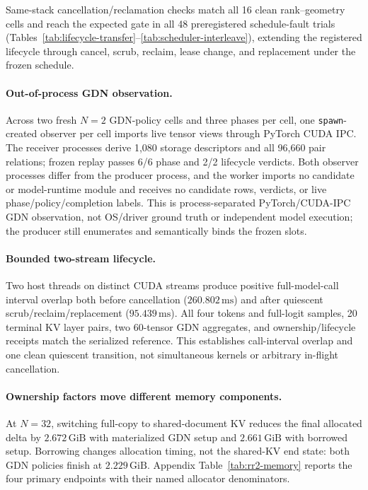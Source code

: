 \documentclass{article}
\newcommand{\gib}{\,\mathrm{GiB}}
\begin{document}


Same-stack cancellation/reclamation checks match all 16 clean rank--geometry
cells and reach the expected gate in all 48 preregistered schedule-fault trials
(Tables~\ref{tab:lifecycle-transfer}--\ref{tab:scheduler-interleave}), extending
the registered lifecycle through cancel, scrub, reclaim, lease change, and
replacement under the frozen schedule.

\paragraph{Out-of-process GDN observation.}
Across two fresh $N=2$ GDN-policy cells and three phases per cell, one
\texttt{spawn}-created observer per cell imports live tensor views through
PyTorch CUDA IPC.  The receiver processes derive 1,080 storage descriptors and
all 96,660 pair relations; frozen replay passes 6/6 phase and 2/2 lifecycle
verdicts.  Both observer processes differ from the producer process, and the
worker imports no candidate or model-runtime module and receives no candidate
rows, verdicts, or live phase/policy/completion labels.  This is
process-separated PyTorch/CUDA-IPC GDN observation, not OS/driver ground truth
or independent model execution; the producer still enumerates and semantically
binds the frozen slots.

\paragraph{Bounded two-stream lifecycle.}
Two host threads on distinct CUDA streams produce positive full-model-call
interval overlap both before cancellation ($260.802\,\mathrm{ms}$) and after
quiescent scrub/reclaim/replacement ($95.439\,\mathrm{ms}$).  All four tokens
and full-logit samples, 20 terminal KV layer pairs, two 60-tensor GDN
aggregates, and ownership/lifecycle receipts match the serialized reference.
This establishes call-interval overlap and one clean quiescent transition, not
simultaneous kernels or arbitrary in-flight cancellation.

\paragraph{Ownership factors move different memory components.}

At $N=32$, switching full-copy to shared-document KV reduces the final allocated
delta by $2.672\gib$ with materialized GDN setup and $2.661\gib$ with borrowed
setup.  Borrowing changes allocation timing, not the shared-KV end state: both
GDN policies finish at $2.229\gib$.  Appendix Table~\ref{tab:rr2-memory} reports
the four primary endpoints with their named allocator denominators.
\end{document}
